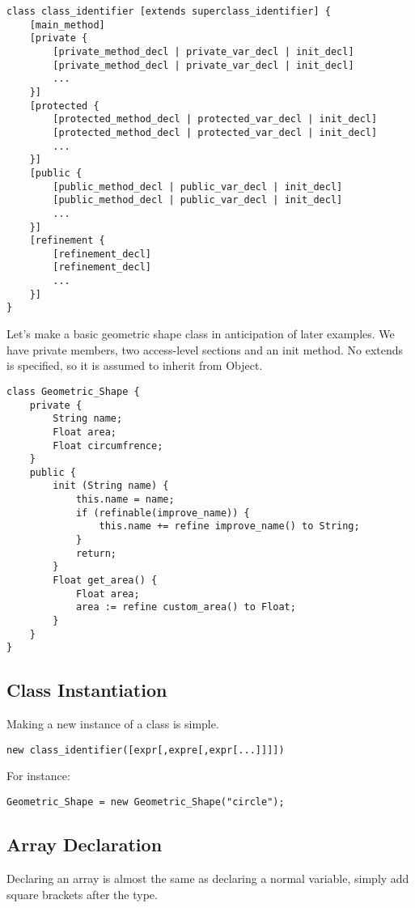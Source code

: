 \begin{lstlisting}
class class_identifier [extends superclass_identifier] {
    [main_method]
    [private {
        [private_method_decl | private_var_decl | init_decl]
        [private_method_decl | private_var_decl | init_decl]
        ...
    }]
    [protected {
        [protected_method_decl | protected_var_decl | init_decl]
        [protected_method_decl | protected_var_decl | init_decl]
        ...
    }]
    [public {
        [public_method_decl | public_var_decl | init_decl]
        [public_method_decl | public_var_decl | init_decl]
        ...
    }]
    [refinement {
        [refinement_decl]
        [refinement_decl]
        ...
    }]
}
\end{lstlisting}

Let's make a basic geometric shape class in anticipation of later examples. We have private members, two access-level sections and an init method. No extends is specified, so it is assumed to inherit from Object.


\begin{lstlisting}[label=Method Invocation,caption=Class Declaration for a Geometric Shape class]
class Geometric_Shape {
    private {
        String name;
        Float area;
        Float circumfrence;
    }
    public {
        init (String name) {
            this.name = name;
            if (refinable(improve_name)) {
                this.name += refine improve_name() to String;
            }
            return;
        }
        Float get_area() {
            Float area;
            area := refine custom_area() to Float;
        }
    }
}
\end{lstlisting}

\subsection{Class Instantiation}
Making a new instance of a class is simple.

\begin{lstlisting}
new class_identifier([expr[,expre[,expr[...]]]])
\end{lstlisting}

For instance:

\begin{lstlisting}[label=Method Invocation,caption=Class Instantiation for a Geometric Shape class]
Geometric_Shape = new Geometric_Shape("circle");
\end{lstlisting}

\subsection{Array Declaration}
Declaring an array is almost the same as declaring a normal variable, simply add square brackets after the type.

